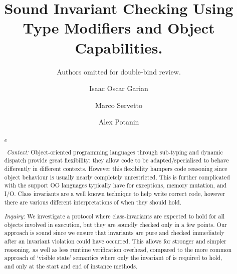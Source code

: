 \documentclass[a4paper,UKenglish]{lipics-v2018}
\title{Sound Invariant Checking Using Type Modifiers and Object Capabilities.}
\author{Authors omitted for double-bind review.}{Unspecified Institution.}{}{}{}
\author{Isaac Oscar Garian}{Victoria University of Wellington}{isaac@ecs.vuw.ac.nz}{}{}
\author{Marco Servetto}{Victoria University of Wellington}{marco.servetto@ecs.vuw.ac.nz}{}{}
\author{Alex Potanin}{Victoria University of Wellington}{alex@ecs.vuw.ac.nz}{}{}
\theoremstyle{plain}
\newcommand{\loseSpace}{\vspace{1ex}}
\begin{document}
\maketitle

\begin{abstract}
{{\ensuremath{\mathit{e}}
		\xspace}}
	
	
${}_{}$
\noindent\textit{Context:} %
Object-oriented programming languages through sub-typing and dynamic dispatch provide great flexibility: they
allow code to be adapted/specialised to behave differently in different contexts.
However this flexibility hampers code reasoning since object behaviour is usually nearly completely
unrestricted. This is further complicated with the support OO languages typically have for exceptions,
memory mutation, and I/O.
Class invariants are a well known technique to help write correct code, however
there are various different interpretations of when they should hold.

\loseSpace
\noindent\textit{Inquiry:} %
We investigate a protocol where class-invariants are expected to hold for all objects involved in execution, but
they are soundly checked only in a few points. Our approach is sound since we ensure that invariants are pure
and checked immediately after an invariant violation could have occurred. This allows for stronger and simpler reasoning, as well as less runtime verification overhead, compared to the
more common approach of `visible state' semantics where only the invariant of \Q@this@ is required to hold, and
only at the start and end of instance methods.





\end{abstract}
\end{document}
